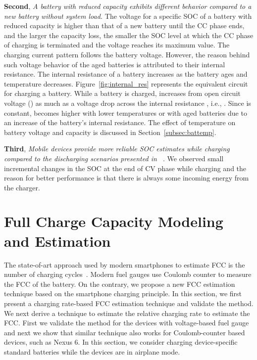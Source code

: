 \documentclass[journal]{IEEEtran}
\begin{document}
\vspace{1mm}
\noindent\textbf{Second}, \textit{A battery with reduced capacity exhibits different behavior compared to a new battery without system load.} The voltage for a specific SOC of a battery with reduced capacity is higher than that of a new battery until the CC phase ends, and the larger the capacity loss, the smaller the SOC level at which the CC phase of charging is terminated and the voltage reaches its maximum value. The charging current pattern follows the battery voltage. However, the reason behind such voltage behavior of the aged batteries is attributed to their internal resistance. The internal resistance of a battery increases as the battery ages and temperature decreases. Figure~\ref{fig:internal_res} represents the equivalent circuit for charging a  battery. While a battery is charged,  increases from open circuit voltage () as much as a voltage drop across the internal resistance , i.e., . Since  is constant,  becomes higher with lower temperatures or with aged batteries due to an increase of the battery's internal resistance. The effect of temperature on battery voltage and capacity is discussed in Section~\ref{subsec:battemp}.





\vspace{1mm}
\noindent\textbf{Third},\textit{ Mobile devices provide more reliable SOC estimates while charging compared to the discharging scenarios presented in ~\cite{mhotpower2015}}. We observed small incremental changes in the SOC at the end of CV phase while charging and the reason for better performance is that there is always some incoming energy from the charger. 







\section{Full Charge Capacity Modeling and  Estimation}
\label{sec:fcc}
The state-of-art approach used by modern smartphones to estimate FCC is the number of charging cycles~\cite{Badam:2015}. Modern fuel gauges use Coulomb counter to measure the FCC of the battery. On the contrary, we propose a new FCC estimation technique based on the smartphone charging principle. In this section, we first present a charging rate-based FCC estimation technique and validate the method. We next derive a technique to estimate  the relative charging rate to estimate the FCC. First we validate the method for the devices with voltage-based fuel gauge and next we show that similar technique also works for Coulomb-counter based devices, such as Nexus 6. In this section, we consider charging device-specific standard batteries while the devices are in airplane mode.
\end{document}
